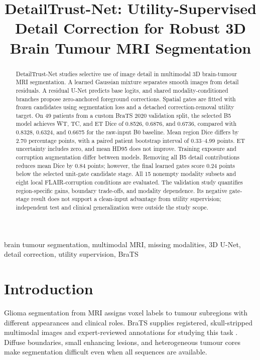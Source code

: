 \documentclass[conference]{IEEEtran}
\title{DetailTrust-Net: Utility-Supervised Detail Correction for Robust 3D Brain Tumour MRI Segmentation}
\author{\IEEEauthorblockN{Samiul Seikh, Vikash Kumar Vivek, Krish Garg, Lakshay Pal, Shena}
\IEEEauthorblockA{Netaji Subhas University of Technology (NSUT), New Delhi, India}}
\begin{document}
\maketitle
\raggedbottom

\begin{abstract}
DetailTrust-Net studies selective use of image detail in multimodal 3D brain-tumour MRI segmentation. A learned Gaussian mixture separates smooth images from detail residuals. A residual U-Net predicts base logits, and shared modality-conditioned branches propose zero-anchored foreground corrections. Spatial gates are fitted with frozen candidates using segmentation loss and a detached correction-removal utility target. On 49 patients from a custom BraTS 2020 validation split, the selected B5 model achieves WT, TC, and ET Dice of 0.8526, 0.6876, and 0.6736, compared with 0.8328, 0.6324, and 0.6675 for the raw-input B0 baseline. Mean region Dice differs by 2.70 percentage points, with a paired patient bootstrap interval of 0.33--4.99 points. ET uncertainty includes zero, and mean HD95 does not improve. Training exposure and corruption augmentation differ between models. Removing all B5 detail contributions reduces mean Dice by 0.84 points; however, the final learned gates score 0.24 points below the selected unit-gate candidate stage. All 15 nonempty modality subsets and eight local FLAIR-corruption conditions are evaluated. The validation study quantifies region-specific gains, boundary trade-offs, and modality dependence. Its negative gate-stage result does not support a clean-input advantage from utility supervision; independent test and clinical generalization were outside the study scope.
\end{abstract}

\begin{IEEEkeywords}
brain tumour segmentation, multimodal MRI, missing modalities, 3D U-Net, detail correction, utility supervision, BraTS
\end{IEEEkeywords}

\section{Introduction}
Glioma segmentation from MRI assigns voxel labels to tumour subregions with different appearances and clinical roles. BraTS supplies registered, skull-stripped multimodal images and expert-reviewed annotations for studying this task \cite{menze2015,bakas2017}. Diffuse boundaries, small enhancing lesions, and heterogeneous tumour cores make segmentation difficult even when all sequences are available.
\end{document}
